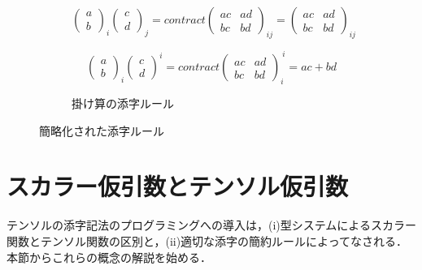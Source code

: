 \begin{figure}
\begin{minipage}[t]{0.5\columnwidth}
\begin{subfigure}[h]{1.0\textwidth}
\begin{center}
\[\begin{pmatrix}
a \\
b
\end{pmatrix}_{i}
\begin{pmatrix}
c \\
d
\end{pmatrix}_{j}
=
contract
\begin{pmatrix}
a c & a d \\
b c & b d
\end{pmatrix}_{ij}
=
\begin{pmatrix}
a c & a d \\
b c & b d
\end{pmatrix}_{ij}\]

\[\begin{pmatrix}
a \\
b
\end{pmatrix}_{i}
\begin{pmatrix}
c \\
d
\end{pmatrix}^{i}
=
contract
\begin{pmatrix}
a c & a d \\
b c & b d
\end{pmatrix}_{i}^{\ i}
= a c + b d\]
\end{center}
\caption{掛け算の添字ルール}
\label{fig:ruleMult}
\end{subfigure}
\end{minipage}
\caption{簡略化された添字ルール}
\label{fig:rule}
\end{figure}

\section{スカラー仮引数とテンソル仮引数}\label{tensor-params}

テンソルの添字記法のプログラミングへの導入は，(i)型システムによるスカラー関数とテンソル関数の区別と，(ii)適切な添字の簡約ルールによってなされる．
本節からこれらの概念の解説を始める．

